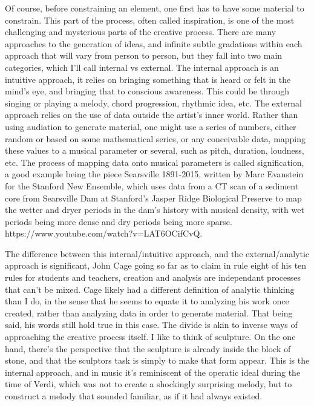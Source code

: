 \documentclass[12pt,twoside,maitrise]{dms}
\theoremstyle{definition}
\begin{document}
Of course, before constraining an element, one first has to have some material to constrain.
This part of the process, often called inspiration, is one of the most challenging and mysterious parts of the creative process.
There are many approaches to the generation of ideas, and infinite subtle gradations within each approach that will vary from person to person, but they fall into two main categories, which I’ll call internal vs external.
The internal approach is an intuitive approach, it relies on bringing something that is heard or felt in the mind’s eye, and bringing that to conscious awareness.
This could be through singing or playing a melody, chord progression, rhythmic idea, etc.
The external approach relies on the use of data outside the artist’s inner world.
Rather than using audiation to generate material, one might use a series of numbers, either random or based on some mathematical series, or any conceivable data, mapping these values to a musical parameter or several, such as pitch, duration, loudness, etc.
The process of mapping data onto musical parameters is called signification, a good example being the piece Searsville 1891-2015, written by Marc Evanstein for the Stanford New Ensemble, which uses data from a CT scan of a sediment core from Searsville Dam at Stanford's Jasper Ridge Biological Preserve to map the wetter and dryer periods in the dam’s history with musical density, with wet periods being more dense and dry periods being more sparse.
https://www.youtube.com/watch?v=LAT6OCifCvQ.

The difference between this internal/intuitive approach, and the external/analytic approach is significant, John Cage going so far as to claim in rule eight of his ten rules for students and teachers, creation and analysis are independant processes that can’t be mixed.
Cage likely had a different definition of analytic thinking than I do, in the sense that he seems to equate it to analyzing his work once created, rather than analyzing data in order to generate material.
That being said, his words still hold true in this case.
The divide is akin to inverse ways of approaching the creative process itself.
I like to think of sculpture.
On the one hand, there’s the perspective that the sculpture is already inside the block of stone, and that the sculptors task is simply to make that form appear.
This is the internal approach, and in music it’s reminiscent of the operatic ideal during the time of Verdi, which was not to create a shockingly surprising melody, but to construct a melody that sounded familiar, as if it had always existed.
\end{document}
